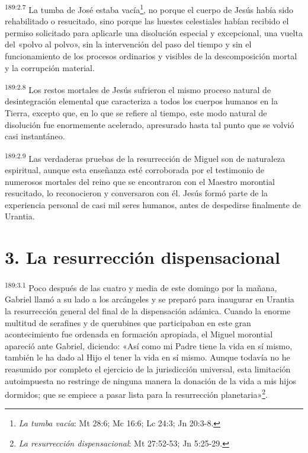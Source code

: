 \par
\textsuperscript{189:2.7} La tumba de José estaba vacía\footnote{\textit{La tumba vacía}: Mt 28:6; Mc 16:6; Lc 24:3; Jn 20:3-8.}, no porque el cuerpo de Jesús había sido rehabilitado o resucitado, sino porque las huestes celestiales habían recibido el permiso solicitado para aplicarle una disolución especial y excepcional, una vuelta del «polvo al polvo», sin la intervención del paso del tiempo y sin el funcionamiento de los procesos ordinarios y visibles de la descomposición mortal y la corrupción material.

\par
\textsuperscript{189:2.8} Los restos mortales de Jesús sufrieron el mismo proceso natural de desintegración elemental que caracteriza a todos los cuerpos humanos en la Tierra, excepto que, en lo que se refiere al tiempo, este modo natural de disolución fue enormemente acelerado, apresurado hasta tal punto que se volvió casi instantáneo.

\par
\textsuperscript{189:2.9} Las verdaderas pruebas de la resurrección de Miguel son de naturaleza espiritual, aunque esta enseñanza esté corroborada por el testimonio de numerosos mortales del reino que se encontraron con el Maestro morontial resucitado, lo reconocieron y conversaron con él. Jesús formó parte de la experiencia personal de casi mil seres humanos, antes de despedirse finalmente de Urantia.

\section*{3. La resurrección dispensacional}
\par
\textsuperscript{189:3.1} Poco después de las cuatro y media de este domingo por la mañana, Gabriel llamó a su lado a los arcángeles y se preparó para inaugurar en Urantia la resurrección general del final de la dispensación adámica. Cuando la enorme multitud de serafines y de querubines que participaban en este gran acontecimiento fue ordenada en formación apropiada, el Miguel morontial apareció ante Gabriel, diciendo: «Así como mi Padre tiene la vida en sí mismo, también le ha dado al Hijo el tener la vida en sí mismo. Aunque todavía no he reasumido por completo el ejercicio de la jurisdicción universal, esta limitación autoimpuesta no restringe de ninguna manera la donación de la vida a mis hijos dormidos; que se empiece a pasar lista para la resurrección planetaria»\footnote{\textit{La resurrección dispensacional}: Mt 27:52-53; Jn 5:25-29.}.

